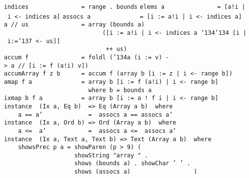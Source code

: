 \mbox{\tt indices\ \ \ \ \ \ \ \ \ \ \ \ \ \ \ =\ range\ .\ bounds}
\eprogB\noindent\bprogB
\mbox{\tt elems\ a\ \ \ \ \ \ \ \ \ \ \ \ \ \ \ =\ [a!i\ |\ i\ <-\ indices\ a]}
\eprogB\noindent\bprogB
\mbox{\tt assocs\ a\ \ \ \ \ \ \ \ \ \ \ \ \ \ =\ [i\ :=\ a!i\ |\ i\ <-\ indices\ a]}
\eprogB\noindent\bprogB
\mbox{\tt a\ //\ us\ \ \ \ \ \ \ \ \ \ \ \ \ \ \ =\ array\ (bounds\ a)}\\
\mbox{\tt \ \ \ \ \ \ \ \ \ \ \ \ \ \ \ \ \ \ \ \ \ \ \ \ \ \ \ \ ([i\ :=\ a!i\ |\ i\ <-\ indices\ a\ {\char'134}{\char'134}\ [i\ |\ i:={\char'137}\ <-\ us]]}\\
\mbox{\tt \ \ \ \ \ \ \ \ \ \ \ \ \ \ \ \ \ \ \ \ \ \ \ \ \ \ \ \ \ ++\ us)}
\eprogB\noindent\bprogB
\mbox{\tt accum\ f\ \ \ \ \ \ \ \ \ \ \ \ \ \ \ =\ foldl\ ({\char'134}a\ (i\ :=\ v)\ ->\ a\ //\ [i\ :=\ f\ (a!i)\ v])}
\eprogB\noindent\bprogB
\mbox{\tt accumArray\ f\ z\ b\ \ \ \ \ \ =\ accum\ f\ (array\ b\ [i\ :=\ z\ |\ i\ <-\ range\ b])}
\eprogB\noindent\bprogB
\mbox{\tt amap\ f\ a\ \ \ \ \ \ \ \ \ \ \ \ \ \ =\ array\ b\ [i\ :=\ f\ (a!i)\ |\ i\ <-\ range\ b]}\\
\mbox{\tt \ \ \ \ \ \ \ \ \ \ \ \ \ \ \ \ \ \ \ \ \ \ \ \ where\ b\ =\ bounds\ a}
\eprogB\noindent\bprogB
\mbox{\tt ixmap\ b\ f\ a\ \ \ \ \ \ \ \ \ \ \ =\ array\ b\ [i\ :=\ a\ !\ f\ i\ |\ i\ <-\ range\ b]}
\eprogB\noindent\bprogB
\mbox{\tt instance\ \ (Ix\ a,\ Eq\ b)\ \ =>\ Eq\ (Array\ a\ b)\ \ where}\\
\mbox{\tt \ \ \ \ a\ ==\ a'\ \ \ \ \ \ \ \ \ \ \ \ \ =\ \ assocs\ a\ ==\ assocs\ a'}
%
\eprogB\noindent\bprogB
\mbox{\tt instance\ \ (Ix\ a,\ Ord\ b)\ =>\ Ord\ (Array\ a\ b)\ \ where}\\
\mbox{\tt \ \ \ \ a\ <=\ \ a'\ \ \ \ \ \ \ \ \ \ \ \ =\ \ assocs\ a\ <=\ \ assocs\ a'}
%
\eprogB\noindent\bprogB
\mbox{\tt instance\ \ (Ix\ a,\ Text\ a,\ Text\ b)\ =>\ Text\ (Array\ a\ b)\ \ where}\\
\mbox{\tt \ \ \ \ showsPrec\ p\ a\ =\ showParen\ (p\ >\ 9)\ (}\\
\mbox{\tt \ \ \ \ \ \ \ \ \ \ \ \ \ \ \ \ \ \ \ \ showString\ "array\ "\ .}\\
\mbox{\tt \ \ \ \ \ \ \ \ \ \ \ \ \ \ \ \ \ \ \ \ shows\ (bounds\ a)\ .\ showChar\ '\ '\ .}\\
\mbox{\tt \ \ \ \ \ \ \ \ \ \ \ \ \ \ \ \ \ \ \ \ shows\ (assocs\ a)\ \ \ \ \ \ \ \ \ \ \ \ \ \ \ \ \ \ )}\\
\mbox{\tt }\\[-8pt]
